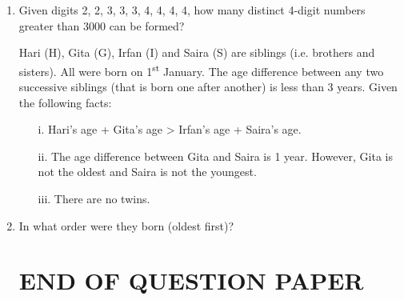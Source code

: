 \documentclass[journal,12pt,onecolumn]{IEEEtran}
\theoremstyle{remark}
\begin{document}
\begin{enumerate}
\setlength{\parskip}{0.5cm}

\noindent\item Given digits 2, 2, 3, 3, 3, 4, 4, 4, 4, how many distinct 4-digit numbers greater than 3000 can be formed?

\hfill{}
\begin{enumerate}
\end{enumerate}

\noindent Hari (H), Gita (G), Irfan (I) and Saira (S) are siblings (i.e. brothers and sisters). All were born on 1\textsuperscript{st} January. The age difference between any two successive siblings (that is born one after another) is less than 3 years. Given the following facts:

\begin{itemize}
  \item[i.] Hari’s age + Gita’s age > Irfan’s age + Saira’s age.
  \item[ii.] The age difference between Gita and Saira is 1 year. However, Gita is not the oldest and Saira is not the youngest.
  \item[iii.] There are no twins.
\end{itemize}

\noindent \item  In what order were they born (oldest first)?

\hfill{}
\begin{enumerate}
\end{enumerate}

\begin{center}
\section*{END OF QUESTION PAPER}
\end{center}

\end{enumerate}
\end{document}
